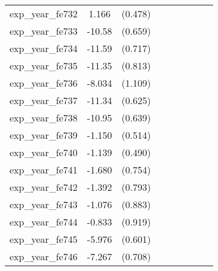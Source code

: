 {\begin{tabular}{l*{4}{cc}}
exp\_year\_fe732&    1.166\sym{*}  &  (0.478)&                  &         &                  &         &                  &         \\
exp\_year\_fe733&   -10.58\sym{***}&  (0.659)&                  &         &                  &         &                  &         \\
exp\_year\_fe734&   -11.59\sym{***}&  (0.717)&                  &         &                  &         &                  &         \\
exp\_year\_fe735&   -11.35\sym{***}&  (0.813)&                  &         &                  &         &                  &         \\
exp\_year\_fe736&   -8.034\sym{***}&  (1.109)&                  &         &                  &         &                  &         \\
exp\_year\_fe737&   -11.34\sym{***}&  (0.625)&                  &         &                  &         &                  &         \\
exp\_year\_fe738&   -10.95\sym{***}&  (0.639)&                  &         &                  &         &                  &         \\
exp\_year\_fe739&   -1.150\sym{*}  &  (0.514)&                  &         &                  &         &                  &         \\
exp\_year\_fe740&   -1.139\sym{*}  &  (0.490)&                  &         &                  &         &                  &         \\
exp\_year\_fe741&   -1.680\sym{*}  &  (0.754)&                  &         &                  &         &                  &         \\
exp\_year\_fe742&   -1.392         &  (0.793)&                  &         &                  &         &                  &         \\
exp\_year\_fe743&   -1.076         &  (0.883)&                  &         &                  &         &                  &         \\
exp\_year\_fe744&   -0.833         &  (0.919)&                  &         &                  &         &                  &         \\
exp\_year\_fe745&   -5.976\sym{***}&  (0.601)&                  &         &                  &         &                  &         \\
exp\_year\_fe746&   -7.267\sym{***}&  (0.708)&                  &         &                  &         &                  &         \\

\end{tabular}}
